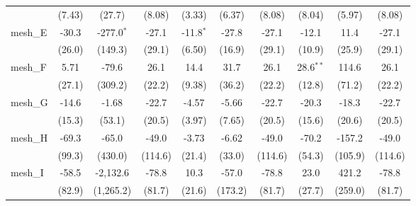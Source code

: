 \begin{tabular}{lccccccccc}
                                                               & (7.43)          & (27.7)          & (8.08)         & (3.33)        & (6.37)        & (8.08)         & (8.04)         & (5.97)        & (8.08)\\   
   mesh\_E                                                     & -30.3           & -277.0$^{*}$    & -27.1          & -11.8$^{*}$   & -27.8         & -27.1          & -12.1          & 11.4          & -27.1\\   
                                                               & (26.0)          & (149.3)         & (29.1)         & (6.50)        & (16.9)        & (29.1)         & (10.9)         & (25.9)        & (29.1)\\   
   mesh\_F                                                     & 5.71            & -79.6           & 26.1           & 14.4          & 31.7          & 26.1           & 28.6$^{**}$    & 114.6         & 26.1\\   
                                                               & (27.1)          & (309.2)         & (22.2)         & (9.38)        & (36.2)        & (22.2)         & (12.8)         & (71.2)        & (22.2)\\   
   mesh\_G                                                     & -14.6           & -1.68           & -22.7          & -4.57         & -5.66         & -22.7          & -20.3          & -18.3         & -22.7\\   
                                                               & (15.3)          & (53.1)          & (20.5)         & (3.97)        & (7.65)        & (20.5)         & (15.6)         & (20.6)        & (20.5)\\   
   mesh\_H                                                     & -69.3           & -65.0           & -49.0          & -3.73         & -6.62         & -49.0          & -70.2          & -157.2        & -49.0\\   
                                                               & (99.3)          & (430.0)         & (114.6)        & (21.4)        & (33.0)        & (114.6)        & (54.3)         & (105.9)       & (114.6)\\   
   mesh\_I                                                     & -58.5           & -2,132.6        & -78.8          & 10.3          & -57.0         & -78.8          & 23.0           & 421.2         & -78.8\\   
                                                               & (82.9)          & (1,265.2)       & (81.7)         & (21.6)        & (173.2)       & (81.7)         & (27.7)         & (259.0)       & (81.7)\\   

\end{tabular}

